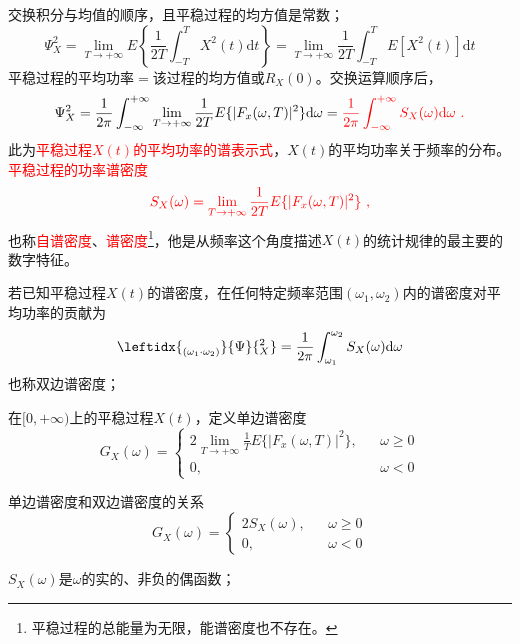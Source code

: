 \documentclass[12pt,a4paper]{article}
\newcommand{\dif}{\mathrm{d}}
\begin{document}
交换积分与均值的顺序，且平稳过程的均方值是常数；
\begin{equation}
\Psi^2_X = \lim_{T\rightarrow +\infty} E\left \{ \frac{1}{2T}\int_{-T}^{T} X^2(t) \dif t \right \} = \lim_{T\rightarrow +\infty} \frac{1}{2T} \int_{-T}^{T} E[X^2(t)] \dif t
\end{equation}
平稳过程的平均功率$=$该过程的均方值或$R_X(0)$。交换运算顺序后，
\begin{equation}
\Psi^2_X = \frac{1}{2\pi} \int_{-\infty}^{+\infty} \lim_{T\rightarrow +\infty} \frac{1}{2T} E\{ |F_x(\omega, T)|^2 \} \dif \omega = \color{red} \frac{1}{2\pi} \int_{-\infty}^{+\infty} S_{X}(\omega) \dif \omega ~.
\end{equation}
此为\textcolor{red}{平稳过程$X(t)$的平均功率的谱表示式}，$X(t)$的平均功率关于频率的分布。\textcolor{red}{平稳过程的功率谱密度}
\begin{equation}
\color{red} S_{X}(\omega) = \lim_{T\rightarrow +\infty} \frac{1}{2T} E\{ |F_x(\omega, T)|^2 \} ~,
\end{equation}
也称\textcolor{red}{自谱密度}、\textcolor{red}{谱密度}\footnote{平稳过程的总能量为无限，能谱密度也不存在。}，他是从频率这个角度描述$X(t)$的统计规律的最主要的数字特征。

若已知平稳过程$X(t)$的谱密度，在任何特定频率范围$(\omega_1, \omega_2)$内的谱密度对平均功率的贡献为
\begin{equation}
\leftidx{_{(\omega_1\cdot \omega_2)}^{} }{\Psi}{^2_X} = \frac{1}{2\pi} \int_{\omega_1}^{\omega_2} S_{X}(\omega) \dif \omega
\end{equation}
也称双边谱密度；

在$[0, +\infty)$上的平稳过程$X(t)$，定义单边谱密度
\begin{equation}
G_X(\omega) = \left\{
\begin{aligned}
2\lim_{T\rightarrow +\infty} \frac{1}{T} E\{ |F_x(\omega, T)|^2 \}, & & \omega \geq 0 \\
0, & & \omega < 0
\end{aligned}
\right.
\end{equation}

单边谱密度和双边谱密度的关系
\begin{equation}
G_X(\omega) = \left\{
\begin{aligned}
2S_X(\omega), & & \omega \geq 0 \\
0, &  & \omega < 0
\end{aligned}
\right.
\end{equation}


$S_X(\omega)$是$\omega$的实的、非负的偶函数；
\end{document}
